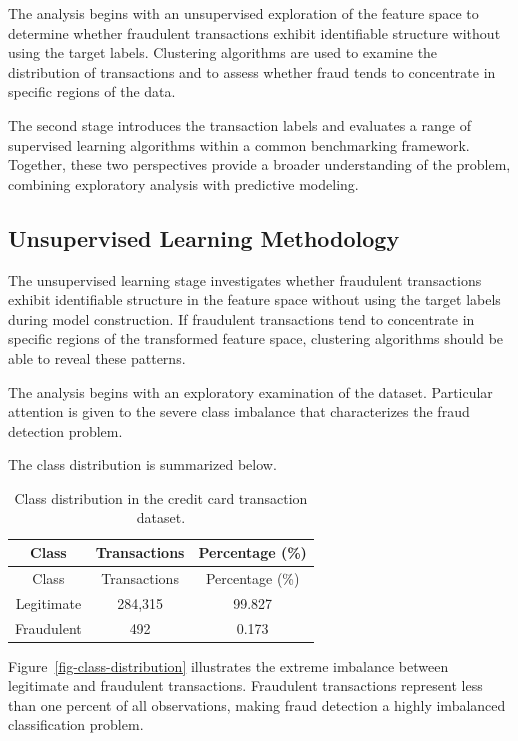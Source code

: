 \documentclass[
  12pt,
  letterpaper,
]{book}
\begin{document}
The analysis begins with an unsupervised exploration of the feature
space to determine whether fraudulent transactions exhibit identifiable
structure without using the target labels. Clustering algorithms are
used to examine the distribution of transactions and to assess whether
fraud tends to concentrate in specific regions of the data.

The second stage introduces the transaction labels and evaluates a range
of supervised learning algorithms within a common benchmarking
framework. Together, these two perspectives provide a broader
understanding of the problem, combining exploratory analysis with
predictive modeling.

\subsection{Unsupervised Learning
Methodology}\label{unsupervised-learning-methodology}

The unsupervised learning stage investigates whether fraudulent
transactions exhibit identifiable structure in the feature space without
using the target labels during model construction. If fraudulent
transactions tend to concentrate in specific regions of the transformed
feature space, clustering algorithms should be able to reveal these
patterns.

The analysis begins with an exploratory examination of the dataset.
Particular attention is given to the severe class imbalance that
characterizes the fraud detection problem.

The class distribution is summarized below.

\begin{longtable}[]{@{}ccc@{}}
\caption{Class distribution in the credit card transaction
dataset.}\label{tbl-target-summary}\tabularnewline
\toprule\noalign{}
Class & Transactions & Percentage (\%) \\
\midrule\noalign{}
\endfirsthead
\toprule\noalign{}
Class & Transactions & Percentage (\%) \\
\midrule\noalign{}
\endhead
\bottomrule\noalign{}
\endlastfoot
Legitimate & 284,315 & 99.827 \\
Fraudulent & 492 & 0.173 \\
\end{longtable}

Figure~\ref{fig-class-distribution} illustrates the extreme imbalance
between legitimate and fraudulent transactions. Fraudulent transactions
represent less than one percent of all observations, making fraud
detection a highly imbalanced classification problem.
\end{document}
